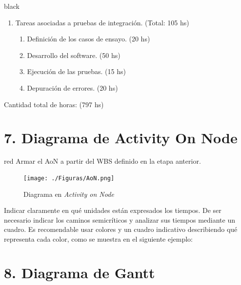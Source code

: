 \documentclass[11pt]{charter}
\begin{document}
\begin{consigna}{black}
\begin{enumerate}
\begin{enumerate}
		\end{enumerate}
		
		 \item Tareas asociadas a pruebas de integración. (Total: 105 hs)
		 \begin{enumerate}
		 	\item Definición de los casos de ensayo. (20 hs)
		 	\item Desarrollo del software. (50 hs)
		 	\item Ejecución de las pruebas. (15 hs)
		 	\item Depuración de errores. (20 hs)
		 \end{enumerate}		
	\end{enumerate}

Cantidad total de horas: (797 hs)

\end{consigna}

\section{7. Diagrama de Activity On Node}
\label{sec:AoN}

\begin{consigna}{red}
Armar el AoN a partir del WBS definido en la etapa anterior. 



\end{consigna}

\begin{figure}[htpb]
\centering 
\texttt{[image: ./Figuras/AoN.png]}
\caption{Diagrama en \textit{Activity on Node}}
\label{fig:AoN}
\end{figure}

Indicar claramente en qué unidades están expresados los tiempos.
De ser necesario indicar los caminos semicríticos y analizar sus tiempos mediante un cuadro.
Es recomendable usar colores y un cuadro indicativo describiendo qué representa cada color, como se muestra en el siguiente ejemplo:



\section{8. Diagrama de Gantt}
\label{sec:gantt}
\end{document}
